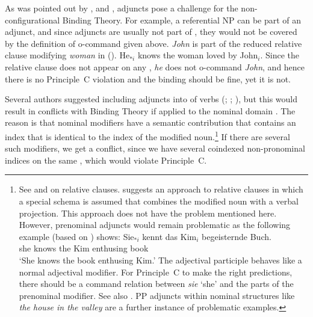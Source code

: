 \documentclass[output=paper,biblatex,babelshorthands,newtxmath,draftmode,colorlinks,citecolor=brown]{langscibook}
\begin{document}
As was pointed out by \citet[]{HL96a}, \citet[Sect~20.4.1]{Mueller99a} and \citet{Walker2011a}, adjuncts pose a challenge for the
non-configurational Binding Theory. For example, a referential NP can be part of an adjunct, and
since adjuncts are usually not part of \argstls, they would not be covered by the definition of
o-command given above. \emph{John} is part of the reduced relative clause modifying \emph{woman} in
().
\ea
\label{ex-he-knows-the-woman-loved-by-John}
He$_{*i}$ knows the woman loved by John$_i$.
\z
Since the relative clause does not appear on any \argstl, \emph{he} does not o-command \emph{John},
and hence there is no Principle~C violation and the binding should be fine, yet it is not.

\largerpage[2]
Several authors suggested including adjuncts into \argstls of verbs
(\citealp[]{Chung98}; \citealp[]{Prze99}; \citealp*[]{MSI99a}), but this would
result in conflicts with Binding Theory if applied to the nominal domain \citep[Section~20.4.1]{Mueller99a}. The reason is that nominal modifiers have a semantic contribution that
contains an index that is identical to the index of the modified noun.\footnote{%
See  and
 on relative clauses. \citet{Sag97a} suggests an approach to relative clauses in
which a special schema is assumed that combines the modified noun with a verbal projection. This
approach does not have the problem mentioned here. However, prenominal adjuncts would remain
problematic as the following example (based on \citealt[]{Mueller99a}) shows:
\ea
\gll Sie$_{*i}$ kennt das Kim$_i$ begeisternde Buch.\\
     she        knows the Kim     enthusing    book\\
\glt `She knows the book enthusing Kim.'
\z
The adjectival participle behaves like a normal adjectival modifier. For Principle~C to make the
right predictions, there should be a command relation between \emph{sie} `she' and the parts of the
prenominal modifier. See also
\crossrefchapterw[\pageref{relative-clauses:fn-page-to-be-read}]{relative-clauses}. PP adjuncts
within nominal structures like \emph{the house in the valley} are a further instance of problematic examples.%
} If there are several such modifiers, we get a conflict, since we have several coindexed non-pronominal indices on the same
\argstl, which would violate Principle~C. 
\end{document}
